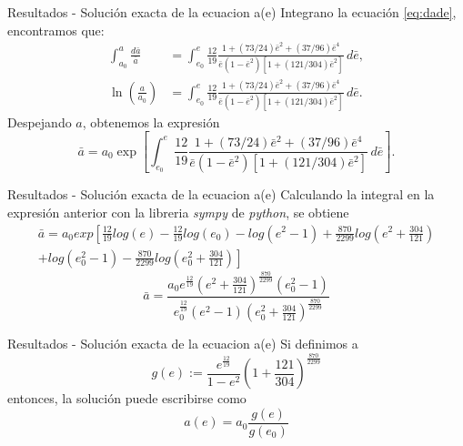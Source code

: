 \begin{frame}{Resultados - Solución exacta de la ecuacion a(e)}
    Integrano la ecuación \ref{eq:dade}, encontramos que:
\begin{align*}
    \int_{a_{0}}^{a}\frac{d\bar{a}}{\bar{a}}&=\int_{e_{0}}^{e}\frac{12}{19}\frac{1+(73/24)\bar{e}^2+(37/96)\bar{e}^4}{\bar{e}(1-\bar{e}^2)[1+(121/304)\bar{e}^2]}\,d\bar{e},\\
    \ln \left(\frac{a}{a_{0}}\right)&=\int_{e_{0}}^{e}\frac{12}{19}\frac{1+(73/24)\bar{e}^2+(37/96)\bar{e}^4}{\bar{e}(1-\bar{e}^2)[1+(121/304)\bar{e}^2]}\,d\bar{e}.
\end{align*}
Despejando $a$, obtenemos la expresión
\begin{equation}
    \bar{a}= a_{0}\exp\left[\int_{e_{0}}^{e}\frac{12}{19}\frac{1+(73/24)\bar{e}^2+(37/96)\bar{e}^4}{\bar{e}(1-\bar{e}^2)[1+(121/304)\bar{e}^2]}\,d\bar{e}\right].
    \label{eq:bara}
\end{equation}
\end{frame}
\begin{frame}{Resultados - Solución exacta de la ecuacion a(e)}
    Calculando la integral en la expresión anterior con la libreria \textit{sympy} de \textit{python}, se obtiene
\begin{eqnarray*}
        \bar{a}=a_0exp\left[\frac{12}{19}log(e)-\frac{12}{19}log(e_0)-log(e^2-1)+\frac{870}{2299}log\left(e^2+\frac{304}{121}\right)\right.\\
        \left.+log\left(e^2_0-1\right)-\frac{870}{2299}log\left(e^2_0+\frac{304}{121}\right)\right]
\end{eqnarray*}
\begin{equation}
    \bar{a}= \frac{a_0e^{\frac{12}{19}}\left(e^2+\frac{304}{121}\right)^{\frac{870}{2299}}\left(e^2_0-1\right)}{e^{\frac{12}{19}}_0\left(e^2-1\right)\left(e_0^2+\frac{304}{121}\right)^{\frac{870}{2299}}}
\end{equation}
\end{frame}
\begin{frame}{Resultados - Solución exacta de la ecuacion a(e)}
    Si definimos a 
\begin{equation}
    g(e):= \frac{e^{\frac{12}{19}}}{1-e^2} \left(1+\frac{121}{304}\right)^{\frac{870}{2299}}
    \label{eq:g(e)}
\end{equation}
entonces, la solución puede escribirse como 
\begin{equation}
    a(e)= a_0\frac{g(e)}{g(e_0)}
    \label{eq:a(e)}
\end{equation}
\end{frame}
